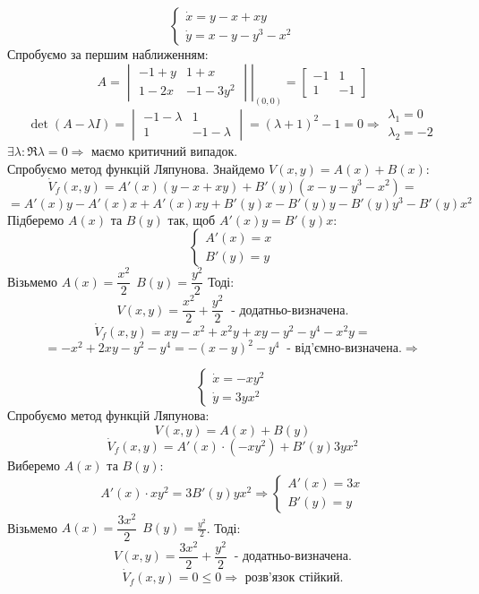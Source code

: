 \begin{example}
 $$
 \begin{cases}
\dot{x} = y-x+xy\\
\dot{y} = x-y-y^3 -x^2
 \end{cases}
 $$
 Спробуємо за першим наближенням:
 $$
 A = \left. \begin{vmatrix}
  -1+y & 1 + x \\
  1 - 2x & -1-3y^2
 \end{vmatrix} \right|_{(0,0)} = \begin{bmatrix}
  -1 & 1 \\
  1 & -1
 \end{bmatrix}
 $$
 $$
 \det(A - \lambda I) = \begin{vmatrix}
   -1 - \lambda & 1 \\
   1 & -1-\lambda
 \end{vmatrix} = (\lambda + 1)^2  - 1 = 0 \Rightarrow \begin{gathered}
  \lambda_1 = 0 \\
  \lambda_2 = -2
 \end{gathered}
 $$
 $\exists \lambda : \Re \lambda = 0 \Longrightarrow $ маємо критичний випадок.\\
Спробуємо метод функцій Ляпунова. Знайдемо $V(x,y) = A(x) + B(x)$:
$$
\dot{V}_f (x,y) = A'(x)(y-x+xy) + B'(y) (x-y-y^3 -x^2) =
$$
$$
= A'(x)y - A'(x)x + A'(x)xy + B'(y)x - B'(y)y - B'(y)y^3 - B'(y)x^2
$$
Підберемо $A(x)$ та $B(y)$ так, щоб $
A'(x)y = B'(y)x
$:
$$
\begin{cases}
 A'(x)  = x\\
 B'(y) = y
\end{cases}
$$
Візьмемо $A(x) = \dfrac{x^2}{2}\ \  B(y) = \dfrac{y^2}{2} $ Тоді:
$$
V(x,y) = \frac{x^2}{2} + \frac{y^2}{2} \ \text{ - додатньо-визначена.}
$$
$$
\dot{V}_f (x,y) = xy - x^2 + x^2 y  + xy - y^2 - y^4 - x^2 y =
$$
$$
= -x^2 + 2xy - y^2 -y^4 = -(x-y)^2 - y^4 \ \text{ - від'ємно-визначена.}  \Longrightarrow
$$
\end{example}

\begin{example}
 $$
 \begin{cases}
  \dot{x } = -xy^2\\
  \dot{y} = 3yx^2
 \end{cases}
 $$
 Спробуємо метод функцій Ляпунова:
 $$
 V(x,y) = A(x) + B(y)
 $$
 $$
 \dot{V}_f (x,y) = A'(x) \cdot (-xy^2) + B'(y) 3yx^2
 $$
 Виберемо $A(x)$ та $B(y)$:
 $$
 A'(x) \cdot xy^2 = 3 B'(y) yx^2 \Longrightarrow \begin{cases}
  A'(x)  = 3x\\
  B'(y) = y
 \end{cases}
 $$
Візьмемо $A(x) = \dfrac{3x^2}{2} \ \  B(y) = \frac{y^2}{2} $. Тоді:
$$
V(x,y) = \frac{3x^2}{2} + \frac{y^2}{2}  \ \text{ - додатньо-визначена.}
$$
$$
\dot{V}_f (x,y) = 0 \leq 0 \Longrightarrow \text{ розв'язок стійкий.}
$$
\end{example}
